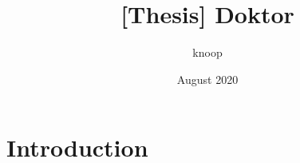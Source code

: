 \documentclass{article}
\title{[Thesis] Doktor}
\author{knoop }
\date{August 2020}
\begin{document}
\maketitle

\section{Introduction}
\end{document}
